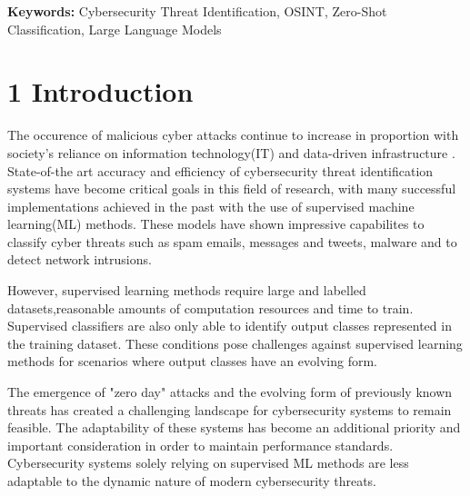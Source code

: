 \documentclass[letterpaper,twocolumn,fleqn]{article}
\begin{document}
\vspace{0.75em} %
\noindent
\textbf{Keywords:} Cybersecurity Threat Identification, OSINT, Zero-Shot Classification, Large Language Models
\vspace{1em} %

\section{1 Introduction}
\label{intro}
The occurence of malicious cyber attacks continue to increase in proportion with society's reliance on information technology(IT) and data-driven infrastructure \cite{jang-jaccardSurveyEmergingThreats2014,daveNewFrontierCybersecurity2023}.
State-of-the art accuracy and efficiency of cybersecurity threat identification systems have become critical goals in this field of research, with many successful implementations achieved in the past with the use of supervised machine learning(ML) methods\cite{shaukatCyberThreatDetection2020,jainSpamDetectionSocial2018,ecolenationalesuperieuredesminesdeparisfranceInterpretableIdentificationCybersecurity2021,dionisioCyberthreatDetectionTwitter2019,chenPerformanceEvaluationMachine2015,al-yaseenRealtimeMultiagentSystem2017}.
These models have shown impressive capabilites to classify cyber threats such as spam emails, messages and tweets\cite{shaukatCyberThreatDetection2020,dionisioCyberthreatDetectionTwitter2019,jainSpamDetectionSocial2018,chenPerformanceEvaluationMachine2015,chen6MillionSpam2015}, malware\cite{shaukatCyberThreatDetection2020} and to detect network intrusions\cite{al-yaseenRealtimeMultiagentSystem2017,vacasDetectingNetworkThreats2018,shaukatCyberThreatDetection2020}. 

However, supervised learning methods require large and labelled datasets,reasonable amounts of computation resources and time to train\cite{wangSurveyZeroShotLearning2019}. Supervised classifiers are also only able to identify output classes represented in the training dataset\cite{wangSurveyZeroShotLearning2019}. These conditions pose challenges against supervised learning methods for scenarios where output classes have an evolving form\cite{wangSurveyZeroShotLearning2019}.

The emergence of "zero day" attacks\cite{abriPerformanceMachineDeep2019} and the evolving form of previously known threats has created a challenging landscape for cybersecurity systems to remain feasible\cite{jang-jaccardSurveyEmergingThreats2014,daveNewFrontierCybersecurity2023}.
The adaptability of these systems has become an additional priority and important consideration in order to maintain performance standards\cite{al-yaseenRealtimeMultiagentSystem2017,abriPerformanceMachineDeep2019,uddinDualTierAdaptiveOneClass2024}. 
Cybersecurity systems solely relying on supervised ML methods are less adaptable to the dynamic nature of modern cybersecurity threats\cite{al-yaseenRealtimeMultiagentSystem2017,abriPerformanceMachineDeep2019,uddinDualTierAdaptiveOneClass2024}. 
\end{document}
